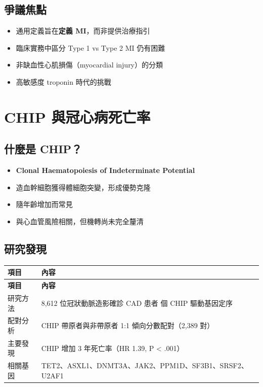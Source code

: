 \documentclass[12pt,a4paper]{article}
\begin{document}
\subsection{爭議焦點}

\begin{itemize}
    \item 通用定義旨在\textbf{定義 MI}，而非提供治療指引
    \item 臨床實務中區分 Type 1 vs Type 2 MI 仍有困難
    \item 非缺血性心肌損傷（myocardial injury）的分類
    \item 高敏感度 troponin 時代的挑戰
\end{itemize}

\section{CHIP 與冠心病死亡率}

\subsection{什麼是 CHIP？}

\begin{itemize}
    \item \textbf{Clonal Haematopoiesis of Indeterminate Potential}
    \item 造血幹細胞獲得體細胞突變，形成優勢克隆
    \item 隨年齡增加而常見
    \item 與心血管風險相關，但機轉尚未完全釐清
\end{itemize}

\subsection{研究發現}

\begin{longtable}{p{4cm}p{10cm}}
\toprule
\textbf{項目} & \textbf{內容} \\
\midrule
\endfirsthead
\midrule
\textbf{項目} & \textbf{內容} \\
\midrule
\endhead
\bottomrule
\endfoot
研究方法 & 8,612 位冠狀動脈造影確診 CAD 患者\newline 13 個 CHIP 驅動基因定序 \\
\midrule
配對分析 & CHIP 帶原者與非帶原者 1:1 傾向分數配對（2,389 對）\\
\midrule
主要發現 & CHIP 增加 3 年死亡率（HR 1.39, P < .001）\\
\midrule
相關基因 & TET2、ASXL1、DNMT3A、JAK2、PPM1D、SF3B1、SRSF2、U2AF1 \\
\bottomrule
\end{longtable}
\end{document}
